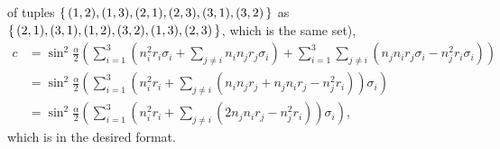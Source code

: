 \begin{enumerate}[label=\alph*)]
    of tuples $\set{(1,2), (1,3), (2,1), (2,3), (3,1), (3,2)}$ as
    $\set{(2,1), (3,1), (1, 2), (3, 2), (1,3), (2,3)}$, which is the same set),
    \begin{align}
        c &= \sin^2 \frac{\alpha}{2} \left(
            \sum_{i = 1}^3 \left(
                n_i^2 r_i \sigma_i + \sum_{j \neq i} n_i n_j r_j \sigma_i
            \right) +
            \sum_{i = 1}^3 \sum_{j \neq i} \left(
                n_j n_i r_j \sigma_i - n_j^2 r_i \sigma_i
            \right)
        \right) \\
        &= \sin^2 \frac{\alpha}{2} \left(
            \sum_{i=1}^3 \left( n_i^2 r_i + \sum_{j \neq i} \left(
                n_i n_j r_j + n_j n_i r_j - n_j^2 r_i
            \right) \right) \sigma_i
        \right) \\
        &= \sin^2 \frac{\alpha}{2} \left(
            \sum_{i=1}^3 \left( n_i^2 r_i + \sum_{j \neq i} \left(
                2 n_j n_i r_j - n_j^2 r_i
            \right) \right) \sigma_i
        \right),
    \end{align}
    which is in the desired format.
    
\end{enumerate}

